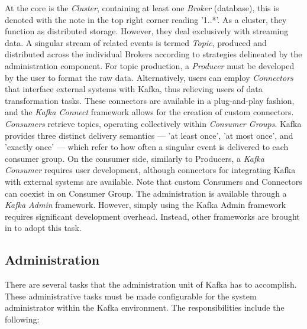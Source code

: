 At the core is the \textit{Cluster}, containing at least one \textit{Broker} (database), this is denoted with the note in the top right corner reading '1..*'. As a cluster, they function as distributed storage. However, they deal exclusively with streaming data. A singular stream of related events is termed \textit{Topic}, produced and distributed across the individual Brokers according to strategies delineated by the administration component. For topic production, a \textit{Producer} must be developed by the user to format the raw data. Alternatively, users can employ \textit{Connectors} that interface external systems with Kafka, thus relieving users of data transformation tasks. These connectors are available in a plug-and-play fashion, and the \textit{Kafka Connect} framework allows for the creation of custom connectors. \textit{Consumers} retrieve topics, operating collectively within \textit{Consumer Groups}. Kafka provides three distinct delivery semantics — 'at least once', 'at most once', and 'exactly once' — which refer to how often a singular event is delivered to each consumer group. On the consumer side, similarly to Producers, a \textit{Kafka Consumer} requires user development, although connectors for integrating Kafka with external systems are available. Note that custom Consumers and Connectors can coexist in on Consumer Group. The administration is available through a \textit{Kafka Admin} framework. However, simply using the Kafka Admin framework requires significant development overhead. Instead, other frameworks are brought in to adopt this task. 

\subsection{Administration}
There are several tasks that the administration unit of Kafka has to accomplish. These administrative tasks must be made configurable for the system administrator within the Kafka environment. The responsibilities include the following: 

